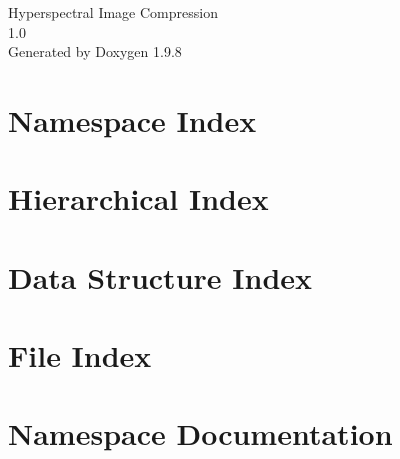 \documentclass[twoside]{book}
\newcommand{\+}{\discretionary{\mbox{\scriptsize$\hookleftarrow$}}{}{}}
\newcommand{\clearemptydoublepage}{%
    \newpage{\pagestyle{empty}\cleardoublepage}%
  }
\begin{document}
  \raggedbottom
    \hypersetup{pageanchor=false,
                bookmarksnumbered=true,
                pdfencoding=unicode
               }
  \begin{titlepage}
  \vspace*{7cm}
  \begin{center}%
  {\Large Hyperspectral Image Compression}\\
  [1ex]\large 1.\+0 \\
  \vspace*{1cm}
  {\large Generated by Doxygen 1.9.8}\\
  \end{center}
  \end{titlepage}
  \clearemptydoublepage
  \tableofcontents
  \clearemptydoublepage
  \hypersetup{pageanchor=true}



\chapter{Namespace Index}

\chapter{Hierarchical Index}

\chapter{Data Structure Index}

\chapter{File Index}

\chapter{Namespace Documentation}














\end{document}
